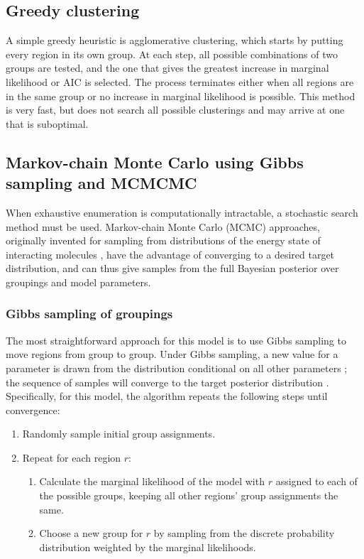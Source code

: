 \documentclass[12pt]{article}
\begin{document}
\subsection{Greedy clustering}
\label{greedy}

A simple greedy heuristic is agglomerative clustering, which starts by putting every region in its own group. At each step, all possible combinations of two groups are tested, and the one that gives the greatest increase in marginal likelihood or AIC is selected. The process terminates either when all regions are in the same group or no increase in marginal likelihood is possible. This method is very fast, but does not search all possible clusterings and may arrive at one that is suboptimal.

\subsection{Markov-chain Monte Carlo using Gibbs sampling and MCMCMC}
\label{mcmc}

When exhaustive enumeration is computationally intractable, a stochastic search method must be used. Markov-chain Monte Carlo (MCMC) approaches, originally invented for sampling from distributions of the energy state of interacting molecules \cite{metropolis1953}, have the advantage of converging to a desired target distribution, and can thus give samples from the full Bayesian posterior over groupings and model parameters.

\subsubsection{Gibbs sampling of groupings}
\label{gibbs}

The most straightforward approach for this model is to use Gibbs sampling to move regions from group to group. Under Gibbs sampling, a new value for a parameter is drawn from the distribution conditional on all other parameters ; the sequence of samples will converge to the target posterior distribution \cite{geman1984}. Specifically, for this model, the algorithm repeats the following steps until convergence:

\begin{enumerate}
\item Randomly sample initial group assignments.
\item Repeat for each region $r$:
	\begin{enumerate}
	\item Calculate the marginal likelihood of the model with $r$ assigned to each of the possible groups, keeping all other regions' group assignments the same.
	\item Choose a new group for $r$ by sampling from the discrete probability distribution weighted by the marginal likelihoods.
	\end{enumerate}
\end{enumerate}
\end{document}
